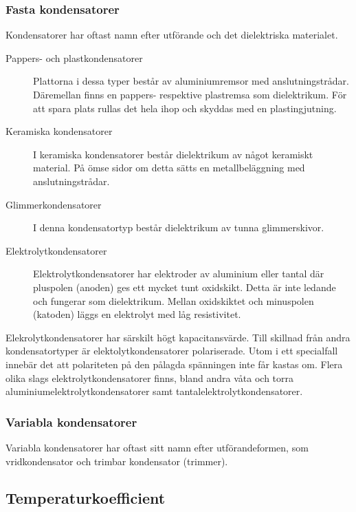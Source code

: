 \subsubsection{Fasta kondensatorer}


Kondensatorer har oftast namn efter utförande och det dielektriska materialet.
\begin{description}
\item[Pappers- och plastkondensatorer]
Plattorna i dessa typer består av aluminiumremsor med anslutningstrådar.
Däremellan finns en pap\-pe\-rs- re\-spe\-k\-ti\-ve plastremsa som dielektrikum.
För att spara plats rullas det hela ihop och skyddas med en plastingjutning.

\item[Keramiska kondensatorer]
I keramiska kondensatorer består dielektrikum av något keramiskt material.
På ömse sidor om detta sätts en metallbeläggning med anslutningstrådar.

\item[Glimmerkondensatorer]
I denna kondensatortyp består dielektrikum av tunna glimmerskivor.

\item[Elektrolytkondensatorer]
Elektrolytkondensatorer har elektroder av aluminium eller tantal där pluspolen
(anoden) ges ett mycket tunt oxidskikt.
Detta är inte ledande och fungerar som dielektrikum.
Mellan oxidskiktet och minuspolen (katoden) läggs en elektrolyt med låg
resistivitet.
\end{description}

\noindent
Elekrolytkondensatorer har särskilt högt kapacitansvärde. Till skillnad från
andra kondensatortyper är elektolytkondensatorer polariserade. Utom i ett
specialfall innebär det att polariteten på den pålagda spänningen inte får
kastas om.
Flera olika slags elektrolytkondensatorer finns, bland andra våta och torra
aluminiumelektrolytkondensatorer samt tantalelektrolytkondensatorer.

\subsubsection{Variabla kondensatorer}
Variabla kondensatorer har oftast sitt namn efter utförandeformen, som
vridkondensator och trimbar kondensator (trimmer).

\subsection{Temperaturkoefficient}

